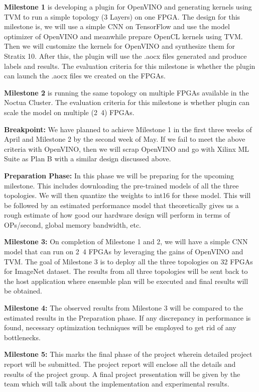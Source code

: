 \documentclass[titlepage]{report}
\begin{document}
\textbf{Milestone 1} is developing a plugin for OpenVINO and generating kernels using TVM to run a simple topology (3 Layers) on one FPGA. The design for this milestone is, we will use a simple CNN on TensorFlow and use the model optimizer of OpenVINO and meanwhile prepare OpenCL kernels using TVM. Then we will customize the kernels for OpenVINO and synthesize them for Stratix 10. After this, the plugin will use the .aocx files generated and produce labels and results. The evaluation criteria for this milestone is whether the plugin can launch the .aocx files we created on the FPGAs. 

\textbf{Milestone 2} is running the same topology on multiple FPGAs available in the Noctua Cluster. The evaluation criteria for this milestone is whether plugin can scale the model on multiple (2~4) FPGAs.

\textbf{Breakpoint:} We have planned to achieve Milestone 1 in the first three weeks of April and Milestone 2 by the second week of May. If we fail to meet the above criteria with OpenVINO, then we will scrap OpenVINO and go with Xilinx ML Suite as Plan B with a similar design discussed above. 

\textbf{Preparation Phase:} In this phase we will be preparing for the upcoming milestone. This includes downloading the pre-trained models of all the three topologies. We will then quantize the weights to int16 for these model. This will be followed by an estimated performance model that theoretically gives us a rough estimate of how good our hardware design will perform in terms of OPs/second, global memory bandwidth, etc.

\textbf{Milestone 3:} On completion of Milestone 1 and 2, we will have a simple CNN model that can run on 2~4 FPGAs by leveraging the gains of OpenVINO and TVM. The goal of Milestone 3 is to deploy all the three topologies on 32 FPGAs for ImageNet dataset. The results from all three topologies will be sent back to the host application where ensemble plan will be executed and final results will be obtained.

\textbf{Milestone 4:} The observed results from Milestone 3 will be compared to the estimated results in the Preparation phase. If any discrepancy in performance is found, necessary optimization techniques will be employed to get rid of any bottlenecks.

\textbf{Milestone 5:} This marks the final phase of the project wherein detailed project report will be submitted. The project report will enclose all the details and results of the project group. A final project presentation will be given by the team which will talk about the implementation and experimental results.
\end{document}
